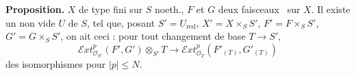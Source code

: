 \documentclass[11pt,a4paper]{article}
\begin{document}
\textbf{Proposition.} $X$ de type fini sur $S$ noeth., $F$ et $G$
deux faisceaux \ sur $X$. 
Il existe  un  non vide $U$ de $S$, tel que,
posant $S' = U_{\mathrm{red}}$, $X' = X \times_S S'$,
$F' = F \times_S S'$, $G' = G \times_S S'$, on ait ceci : pour tout
changement de base $T \to S'$,  \ \ill{}
\[
  \mathcal{E}xt^p_{\mathcal{O}_{S'}}(F', G') \otimes_{S'} T \longrightarrow
  \mathcal{E}xt^p_{\mathcal{O}_T}(F'_{(T)}, G'_{(T)})
\]
 des isomorphismes pour $|p| \le N$.
\end{document}
